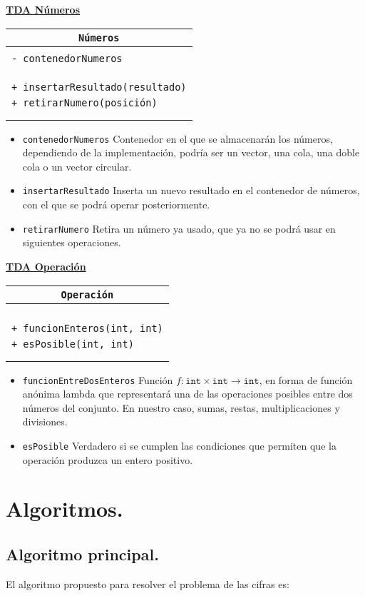 \documentclass[a4paper,10pt]{scrartcl}
\newcommand{\objeto}[4]{\indent\underline{\textbf{TDA #1}}
            \begin{center}\begin{tabular}{|p{7cm}|}
                 \hline
                 \multicolumn{1}{|c|}{\texttt{#1}}\\
                 \hline
                  \\#2\\\\
                 \hline
                 \\#3\\\\
                 \hline
            \end{tabular}\end{center}
            \begin{itemize}
            #4
            \end{itemize}
               }
\def\C++#1{\texttt{#1}}
\begin{document}
  \newpage
  \objeto{Números}{\C++{- contenedorNumeros}\\
  }{
		   \C++{+ insertarResultado(resultado)}\\
		   \C++{+ retirarNumero(posición)}\\
  }{
    \item \C++{contenedorNumeros} Contenedor en el que se almacenarán los números,
    dependiendo de la implementación, podría ser un vector, una cola, una doble cola o un vector circular.
    \item \C++{insertarResultado} Inserta un nuevo resultado en el contenedor de números,
    con el que se podrá operar posteriormente.
    \item \C++{retirarNumero} Retira un número ya usado, que ya no se podrá usar en siguientes operaciones.
  }
  
  \objeto{Operación}{
  }{
		   \C++{+ funcionEnteros(int, int)}\\
		   \C++{+ esPosible(int, int)}\\
  }{
    \item \C++{funcionEntreDosEnteros} Función $f: \C++{int} \times \C++{int} \rightarrow \C++{int}$,
    en forma de función anónima lambda que representará una de las operaciones posibles entre dos
    números del conjunto. En nuestro caso, sumas, restas, multiplicaciones y divisiones.
    \item \C++{esPosible} Verdadero si se cumplen las condiciones que permiten que la operación
    produzca un entero positivo.
  }
   
   \newpage
   
\section{Algoritmos.}
\subsection{Algoritmo principal.}
   El algoritmo propuesto para resolver el problema de las cifras es:\\
   
\end{document}

